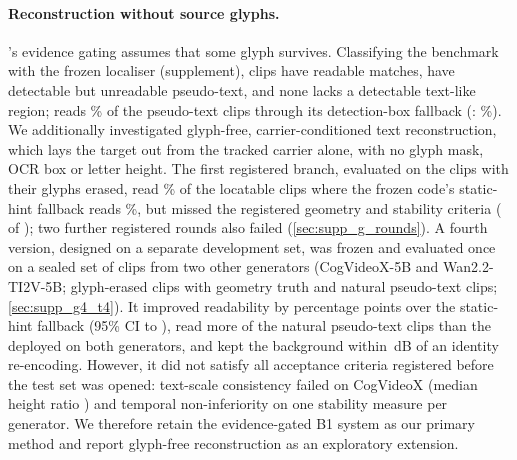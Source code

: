 \paragraph{Reconstruction without source glyphs.} \method's evidence gating assumes that some glyph survives. Classifying the benchmark with the frozen localiser (supplement), \lthreeGlyphs{} clips have readable matches, \lthreeLtwo{} have detectable but unreadable pseudo-text, and none lacks a detectable text-like region; \method reads \lthreeLtwoBoneRead\% of the pseudo-text clips through its detection-box fallback (\steer: \lthreeLtwoSteerRead\%). We additionally investigated glyph-free, carrier-conditioned text reconstruction, which lays the target out from the tracked carrier alone, with no glyph mask, OCR box or letter height. The first registered branch, evaluated on the \lthreeGlyphs{} clips with their glyphs erased, read \lthreeACarRead\% of the locatable clips where the frozen code's static-hint fallback reads \lthreeABfbRead\%, but missed the registered geometry and stability criteria (\lthreeAPassed{} of \lthreeACriteria); two further registered rounds also failed (\cref{sec:supp_g_rounds}). A fourth version, designed on a separate development set, was frozen and evaluated once on a sealed set of clips from two other generators (CogVideoX-5B and Wan2.2-TI2V-5B; \gTSynN{} glyph-erased clips with geometry truth and \gTNatN{} natural pseudo-text clips; \cref{sec:supp_g4_t4}). It improved readability by \gTReadGainU{} percentage points over the static-hint fallback (95\% CI \gTReadGainLo{} to \gTReadGainHi), read more of the natural pseudo-text clips than the deployed \method on both generators, and kept the background within \gTBgMaxGap\,dB of an identity re-encoding. However, it did not satisfy all acceptance criteria registered before the test set was opened: text-scale consistency failed on CogVideoX (median height ratio \gTCogHeight) and temporal non-inferiority on one stability measure per generator. We therefore retain the evidence-gated B1 system as our primary method and report glyph-free reconstruction as an exploratory extension.


